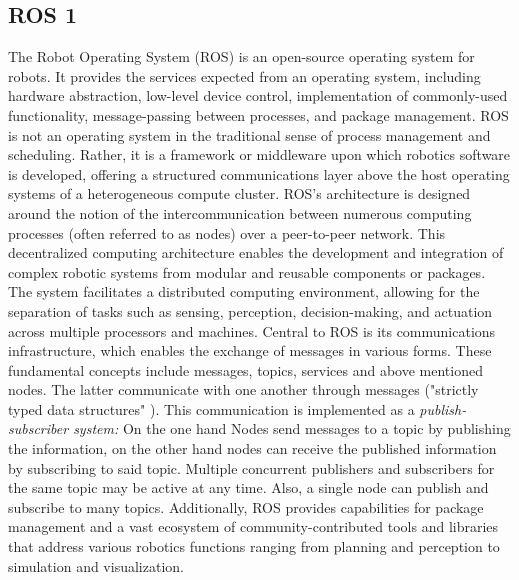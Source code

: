 \documentclass[%
paper=A4,               %
twoside=true,           %
openright,              %
11pt,                   %
bibliography=totoc,     %
titlepage=on,           %
DIV=12,                 %
BCOR=1.5cm,             %
parskip=half,            %
final
]{scrreprt}
\begin{document}
	\subsection{ROS 1}
	The Robot Operating System (ROS) is an open-source operating system for robots. It provides the services expected from an operating system, including hardware abstraction, low-level device control, implementation of commonly-used functionality, message-passing between processes, and package management. ROS is not an operating system in the traditional sense of process management and scheduling. Rather, it is a framework or middleware upon which robotics software is developed, offering a structured communications layer above the host operating systems of a heterogeneous compute cluster. \autocite{quigleyROSOpensourceRobot2009,ros.orgIntroductionROS2024}
	ROS's architecture is designed around the notion of the intercommunication between numerous computing processes (often referred to as nodes) over a peer-to-peer network. This decentralized computing architecture enables the development and integration of complex robotic systems from modular and reusable components or packages. The system facilitates a distributed computing environment, allowing for the separation of tasks such as sensing, perception, decision-making, and actuation across multiple processors and machines. \autocite{quigleyROSOpensourceRobot2009}
	Central to ROS is its communications infrastructure, which enables the exchange of messages in various forms. These fundamental concepts include messages, topics, services and above mentioned nodes. The latter communicate with one another through messages ("strictly typed data structures" \autocite{quigleyROSOpensourceRobot2009}). This communication is implemented as a \textit{publish-subscriber system:} On the one hand Nodes send messages to a topic by publishing the information, on the other hand nodes can receive the published information by subscribing to said topic. Multiple concurrent publishers and subscribers for the same topic may be active at any time. Also, a single node can publish and subscribe to many topics. \autocite{quigleyROSOpensourceRobot2009}
	Additionally, ROS provides capabilities for package management and a vast ecosystem of community-contributed tools and libraries that address various robotics functions ranging from planning and perception to simulation and visualization.
	\autocite{quigleyROSOpensourceRobot2009,ros.orgIntroductionROS2024}
\end{document}
